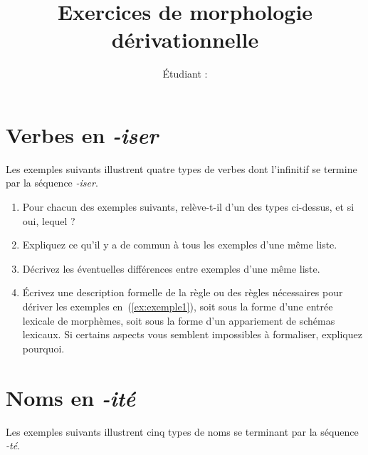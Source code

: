 

\title{Exercices de morphologie dérivationnelle}
\author{}
\date{Étudiant : \student}

\maketitle

\section{Verbes en \emph{-iser}}

Les exemples suivants illustrent quatre types de verbes dont l'infinitif  se termine par la séquence \emph{-iser}.

\begin{exe}
  \ex\begin{xlist}
    \ex \adjexun
    \ex \nounexun
    \ex \label{ex:exemple1} \prefixexun
    \ex \simplexexun
  \end{xlist}
\end{exe}

\begin{enumerate}
\item Pour chacun des exemples suivants, relève-t-il d'un des types ci-dessus, et si oui, lequel ?
  \begin{exe}
    \ex \aclasserexun
  \end{exe}
\item Expliquez ce qu'il y a de commun à tous les exemples d'une même liste.
  
\item Décrivez les éventuelles différences entre exemples d'une même liste.
  
\item Écrivez une description formelle de la règle ou des règles nécessaires pour dériver les exemples en~(\ref{ex:exemple1}), soit sous la forme d'une entrée lexicale de morphèmes, soit sous la forme d'un appariement de schémas lexicaux. Si certains aspects vous semblent impossibles à formaliser, expliquez pourquoi.
  
\end{enumerate}

\section{Noms en \emph{-ité}}

Les exemples suivants illustrent cinq types de noms se terminant par la séquence \emph{-té}.

